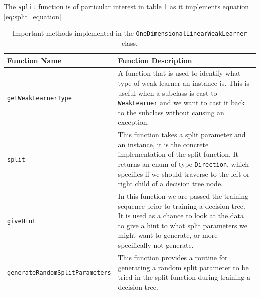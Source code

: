 \documentclass[12pt,twoside,notitlepage]{report}
\begin{document}
                The \texttt{split} function is of particular interest in table \ref{tab:OneDimensionalLinearWeakLearner} as 
                it implements equation \ref{eq:split_equation}. 

                \begin{table}[H]
                    \begin{tabularx}{\textwidth}{l|X}
                        \textbf{Function Name} & \textbf{Function Description} \\
                        \hline

                        \texttt{getWeakLearnerType} & 
                            A function that is used to identify what type of weak learner an instance is. This is 
                            useful when a subclass is cast to \texttt{WeakLearner} and we want to cast it back to 
                            the subclass without causing an exception. \\ 
                        \hline

                        \texttt{split} & 
                            This function takes a split parameter and an instance, it is the concrete implementation 
                            of the split function. It returns an enum of type \texttt{Direction}, which specifies if 
                            we should traverse to the left or right child of a decision tree node. \\ 
                        \hline

                        \texttt{giveHint} & 
                            In this function we are passed the training sequence prior to training a decision tree. 
                            It is used as a chance to look at the data to give a hint to what split parameters we 
                            might want to generate, or more specifically not generate. \\ 
                        \hline

                        \texttt{generateRandomSplitParameters} & 
                            This function provides a routine for generating a random split parameter to be tried in the 
                            split function during training a decision tree. \\ 

                    \end{tabularx}
                    \caption[The methods of \texttt{OneDimesnionalLinearWeakLearner}.]{Important methods implemented in the \texttt{OneDimensionalLinearWeakLearner} class.}
                    \label{tab:OneDimensionalLinearWeakLearner}
                \end{table}
\end{document}
